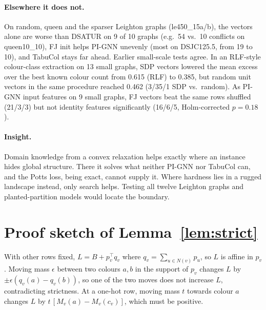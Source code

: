 \documentclass[11pt]{article}
\begin{document}
\paragraph{Elsewhere it does not.} On random, queen and the sparser Leighton
graphs (le450\_15a/b), the vectors alone are worse than DSATUR on 9 of 10
graphs (e.g.\ 54 vs.\ 10 conflicts on queen10\_10), FJ init helps PI-GNN
unevenly (most on DSJC125.5, from 19 to 10), and TabuCol stays far ahead.
Earlier small-scale tests agree. In an RLF-style colour-class extraction on 13
small graphs, SDP vectors lowered the mean excess over the best known colour
count from 0.615 (RLF) to 0.385, but random unit vectors in the same procedure
reached 0.462 (3/35/1 SDP vs.\ random). As PI-GNN input features on 9 small
graphs, FJ vectors beat the same rows shuffled (21/3/3) but not identity
features significantly (16/6/5, Holm-corrected $p=0.18$).

\paragraph{Insight.} Domain knowledge from a convex relaxation helps exactly
where an instance hides global structure. There it solves what neither PI-GNN
nor TabuCol can, and the Potts loss, being exact, cannot supply it. Where
hardness lies in a rugged landscape instead, only search helps. Testing all
twelve Leighton graphs and planted-partition models would locate the boundary.

\section{Proof sketch of Lemma~\ref{lem:strict}}
\label{app:proof}

With other rows fixed, $L=B+p_v^\top q_v$ where $q_v=\sum_{u\in N(v)}p_u$, so
$L$ is affine in $p_v$. Moving mass $\epsilon$ between two colours $a,b$ in
the support of $p_v$ changes $L$ by $\pm\epsilon(q_v(a)-q_v(b))$, so one of the
two moves does not increase $L$, contradicting strictness. At a one-hot row,
moving mass $t$ towards colour $a$ changes $L$ by $t\,[M_v(a)-M_v(c_v)]$, which
must be positive.
\end{document}
